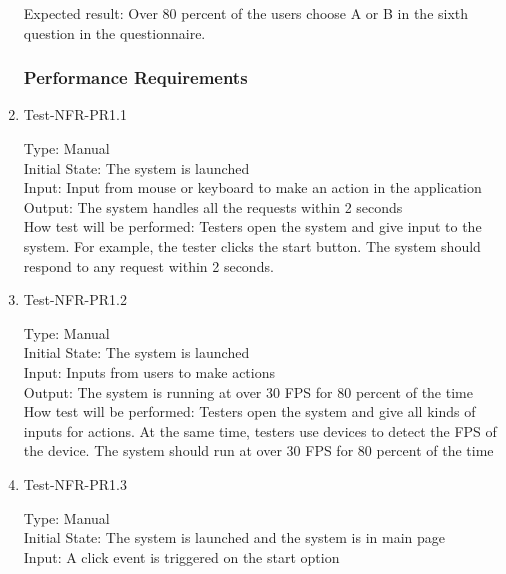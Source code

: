 \documentclass[12pt, titlepage]{article}
\begin{document}
\begin{enumerate}
Expected result: Over 80 percent of the users choose A or B in the sixth question in the questionnaire.

\subsubsection{Performance Requirements}
\item{Test-NFR-PR1.1\\}

Type: Manual\\

Initial State: The system is launched\\

Input: Input from mouse or keyboard to make an action in the application\\

Output: The system handles all the requests within 2 seconds\\

How test will be performed: Testers open the system and give input to the system. For example, the tester clicks the start button. The system should respond to any request within 2 seconds.

\item{Test-NFR-PR1.2\\}

Type: Manual\\

Initial State: The system is launched\\

Input: Inputs from users to make actions\\

Output: The system is running at over 30 FPS for 80 percent of the time\\

How test will be performed: Testers open the system and give all kinds of inputs for actions. At the same time, testers use devices to detect the FPS of the device. The system should run at over 30 FPS for 80 percent of the time

\item{Test-NFR-PR1.3\\}

Type: Manual\\

Initial State: The system is launched and the system is in main page\\

Input: A click event is triggered on the start option\\


\end{enumerate}
\end{document}
